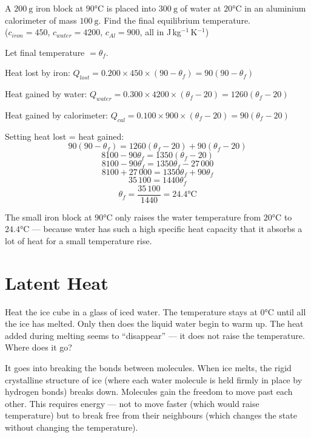 \begin{examplebox}[15.3]
A $200\ \text{g}$ iron block at $90°\text{C}$ is
placed into $300\ \text{g}$ of water at $20°\text{C}$
in an aluminium calorimeter of mass $100\ \text{g}$.
Find the final equilibrium temperature.\\
($c_{iron} = 450$, $c_{water} = 4200$,
$c_{Al} = 900$, all in J\,kg$^{-1}$\,K$^{-1}$)
\end{examplebox}

\begin{solutionbox}
Let final temperature $= \theta_f$.

Heat lost by iron:
$Q_{lost} = 0.200 \times 450 \times (90 - \theta_f)
= 90(90 - \theta_f)$

Heat gained by water:
$Q_{water} = 0.300 \times 4200 \times (\theta_f - 20)
= 1260(\theta_f - 20)$

Heat gained by calorimeter:
$Q_{cal} = 0.100 \times 900 \times (\theta_f - 20)
= 90(\theta_f - 20)$

Setting heat lost = heat gained:
\[
  90(90 - \theta_f) = 1260(\theta_f - 20)
  + 90(\theta_f - 20)
\]
\[
  8100 - 90\theta_f = 1350(\theta_f - 20)
\]
\[
  8100 - 90\theta_f = 1350\theta_f - 27\,000
\]
\[
  8100 + 27\,000 = 1350\theta_f + 90\theta_f
\]
\[
  35\,100 = 1440\theta_f
\]
\[
  \theta_f = \frac{35\,100}{1440} = 24.4°\text{C}
\]

The small iron block at $90°\text{C}$ only raises the
water temperature from $20°\text{C}$ to $24.4°\text{C}$
--- because water has such a high specific heat capacity
that it absorbs a lot of heat for a small temperature rise.
\end{solutionbox}

\section{Latent Heat}

Heat the ice cube in a glass of iced water. The
temperature stays at $0°\text{C}$ until all the ice
has melted. Only then does the liquid water begin to
warm up. The heat added during melting seems to
``disappear'' --- it does not raise the temperature.
Where does it go?

It goes into breaking the bonds between molecules.
When ice melts, the rigid crystalline structure of
ice (where each water molecule is held firmly in
place by hydrogen bonds) breaks down. Molecules gain
the freedom to move past each other. This requires
energy --- not to move faster (which would raise
temperature) but to break free from their neighbours
(which changes the state without changing the
temperature).

